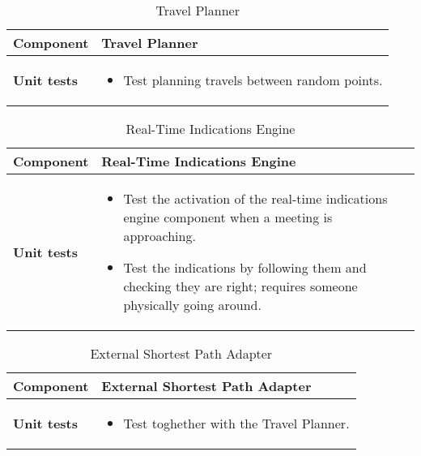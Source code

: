 \begin{table}[h]	
	\centering
	\def\arraystretch{1.5}
	\begin{tabular}{|m{4cm}|m{12cm}|}
		\hline
		\textbf{Component} & Travel Planner \\ \hline
		\textbf{Unit tests} & 
			\begin{itemize}
			\item Test planning travels between random points.
			\end{itemize} \\ \hline
	\end{tabular}
	\caption{Travel Planner}
\end{table}

\begin{table}[h]	
	\centering
	\def\arraystretch{1.5}
	\begin{tabular}{|m{4cm}|m{12cm}|}
		\hline
		\textbf{Component} & Real-Time Indications Engine \\ \hline
		\textbf{Unit tests} & 
			\begin{itemize}
			\item Test the activation of the real-time indications engine component when a meeting is approaching.
			\item Test the indications by following them and checking they are right; requires someone physically going around.
			\end{itemize} \\ \hline
	\end{tabular}
	\caption{Real-Time Indications Engine}
\end{table}

\begin{table}[h]	
	\centering
	\def\arraystretch{1.5}
	\begin{tabular}{|m{4cm}|m{12cm}|}
		\hline
		\textbf{Component} & External Shortest Path Adapter \\ \hline
		\textbf{Unit tests} & 
			\begin{itemize}
			\item Test toghether with the Travel Planner.
			\end{itemize} \\ \hline
	\end{tabular}
	\caption{External Shortest Path Adapter}
\end{table}

